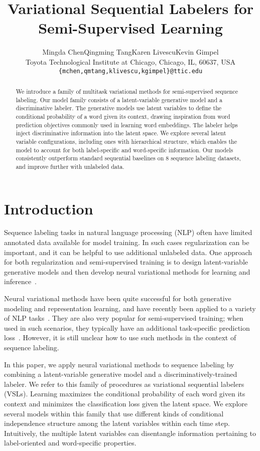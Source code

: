 \documentclass[11pt,a4paper]{article}
\title{Variational Sequential Labelers for Semi-Supervised Learning}
\author{Mingda Chen\qquad Qingming Tang\qquad Karen Livescu\qquad Kevin Gimpel\\
Toyota Technological Institute at Chicago, Chicago, IL, 60637, USA\\
  {\tt \{mchen,qmtang,klivescu,kgimpel\}@ttic.edu}\\}
\date{}
\begin{document}
\maketitle
\begin{abstract}
We introduce a family of multitask variational methods for semi-supervised sequence labeling. Our model family consists of a latent-variable generative model and a discriminative labeler.
The generative models use latent variables to define the conditional probability of a word given its context, drawing inspiration from word prediction objectives commonly used in learning word embeddings.
The labeler
helps inject discriminative information into the latent space.
We explore several latent variable configurations, including ones with hierarchical structure, which enables the model to account for both label-specific and word-specific information.
Our models consistently outperform standard sequential baselines on 8 sequence labeling datasets, and improve further with unlabeled data.
\end{abstract}

\section{Introduction}

Sequence labeling tasks in natural language processing (NLP) often have limited annotated data available for model training. In such cases regularization can be important, and it can be helpful to use additional unlabeled data. One approach for both regularization and semi-supervised training is to design latent-variable generative models and then develop neural variational methods for learning and inference~\cite{kingma2013auto,rezende2015variational}.

Neural variational methods have been quite successful for both generative modeling and representation learning, and have recently been applied to a variety of NLP tasks~\cite{mnih2014neural,bowman2016generating,miao2016neural,serban2017piecewise,zhou2017multi,hu2017toward}. They are also very popular for semi-supervised training; when used in such scenarios, they typically have an additional task-specific prediction loss~\cite{kingma2014semi,maaloe2016auxiliary,zhou2017multi,yang2017improved}. However, it is still unclear how to use such methods in the context of sequence labeling.

In this paper, we apply neural variational methods to sequence labeling by combining a latent-variable generative model and a discriminatively-trained labeler.
We refer to this family of procedures as variational sequential labelers (VSLs).
Learning  maximizes the conditional probability of
each word given its context and minimizes the classification loss given the latent space.
We explore several models within this family that use different kinds of conditional independence structure among the latent variables within each time step. Intuitively, the multiple latent variables can disentangle information pertaining to label-oriented and word-specific properties.
\end{document}
